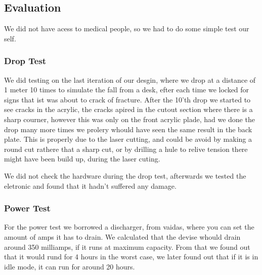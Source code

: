 \subsection{Evaluation}
We did not have acess to medical people, so we had to do some simple test our self.
\subsubsection{Drop Test}
We did testing on the last iteration of our desgin, where we drop at a distance of 1 meter 10 times to simulate the fall from a desk, efter each time we locked for signs that ist was about to crack of fracture.
After the 10'th drop we started to see cracks in the acrylic, the cracks apired in the cutout section where there is a sharp courner, however this was only on the front acrylic plade, had we done the drop many more times we prolery whould have seen the same result in the back plate. 
This is properly due to the laser cutting, and could be avoid by making a round cut rathere that a sharp cut, or by drilling a hule to relive tension there might have been build up, during the laser cuting.

We did not check the hardware during the drop test, afterwards we tested the eletronic and found that it hadn't suffered any damage.

\subsubsection{Power Test}
For the power test we borrowed a discharger, from vaidas, where you can set the amount of amps it has to drain.
We calculated that the devise whould drain around 350 milliamps, if it runs at maximum capacity.
From that we found out that it would rund for 4 hours in the worst case, we later found out that if it is in idle mode, it can run for around 20 hours.

